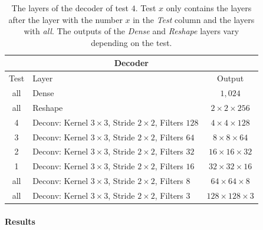 \begin{center}
    \begin{table}[H]
        \centering
        \begin{tabular}{ | c | l | c | }
            \multicolumn{3}{c}{Decoder} \\ \hline
            Test &Layer & Output\\ \hline
            all &Dense                                                            & $1,024$                   \\
            all &Reshape                                                          & $2\times 2\times    256$  \\
            4   &Deconv: Kernel $3\times3$, Stride $2\times2$, Filters $128$      & $4\times 4\times    128$  \\  
            3   &Deconv: Kernel $3\times3$, Stride $2\times2$, Filters $64 $      & $8\times 8\times    64 $  \\
            2   &Deconv: Kernel $3\times3$, Stride $2\times2$, Filters $32 $      & $16\times 16\times  32 $  \\
            1   &Deconv: Kernel $3\times3$, Stride $2\times2$, Filters $16 $      & $32\times 32\times  16 $  \\
            all &Deconv: Kernel $3\times3$, Stride $2\times2$, Filters $8  $      & $64\times 64\times  8  $  \\
            all &Deconv: Kernel $3\times3$, Stride $2\times2$, Filters $3  $      & $128\times 128\times3  $  \\
            \hline
        \end{tabular} 
        \caption{The layers of the decoder of test $4$. 
        Test $x$ only contains the layers after the layer with the number
        $x$ in the \textit{Test} column and the layers with \textit{all}.
        The outputs of the \textit{Dense} and \textit{Reshape}
        layers vary depending on the test.}
    \end{table}
\end{center}

\paragraph{Results} \mbox{}\\

